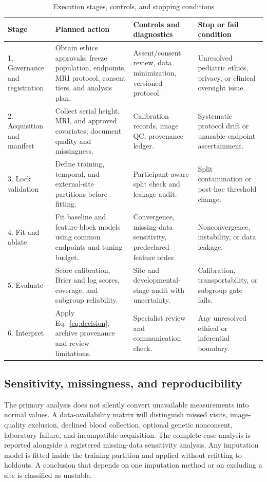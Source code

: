 \documentclass[conference]{IEEEtran}
\begin{document}
\begin{table}[t]
\caption{Execution stages, controls, and stopping conditions}
\label{tab:protocol}
\centering
\footnotesize
\begin{tabular}{p{}p{}p{}p{}}
\toprule
Stage & Planned action & Controls and diagnostics & Stop or fail condition \\
\midrule
1. Governance and registration & Obtain ethics approvals; freeze population, endpoints, MRI protocol, consent tiers, and analysis plan. & Assent/consent review, data minimization, versioned protocol. & Unresolved pediatric ethics, privacy, or clinical oversight issue. \\
2. Acquisition and manifest & Collect serial height, MRI, and approved covariates; document quality and missingness. & Calibration records, image QC, provenance ledger. & Systematic protocol drift or unusable endpoint ascertainment. \\
3. Lock validation & Define training, temporal, and external-site partitions before fitting. & Participant-aware split check and leakage audit. & Split contamination or post-hoc threshold change. \\
4. Fit and ablate & Fit baseline and feature-block models using common endpoints and tuning budget. & Convergence, missing-data sensitivity, predeclared feature order. & Nonconvergence, instability, or data leakage. \\
5. Evaluate & Score calibration, Brier and log scores, coverage, and subgroup reliability. & Site and developmental-stage audit with uncertainty. & Calibration, transportability, or subgroup gate fails. \\
6. Interpret & Apply Eq.~\eqref{eq:decision}; archive provenance and review limitations. & Specialist review and communication check. & Any unresolved ethical or inferential boundary. \\
\bottomrule
\end{tabular}
\end{table}

\subsection{Sensitivity, missingness, and reproducibility}

The primary analysis does not silently convert unavailable measurements into normal values. A data-availability matrix will distinguish missed visits, image-quality exclusion, declined blood collection, optional genetic nonconsent, laboratory failure, and incompatible acquisition. The complete-case analysis is reported alongside a registered missing-data sensitivity analysis. Any imputation model is fitted inside the training partition and applied without refitting to holdouts. A conclusion that depends on one imputation method or on excluding a site is classified as unstable.
\end{document}
